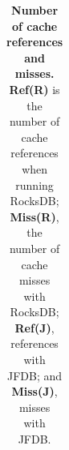 \begin{table}
\begin{tabular}{| l | r | r | r | r | }
    \end{tabular}
    \vspace{5pt}
    \caption{\textbf{Number of cache references and misses.}
        \textbf{Ref(R)} is the number of cache references when running RocksDB; 
        \textbf{Miss(R)}, the number of cache misses with RocksDB; 
        \textbf{Ref(J)}, references with JFDB; and \textbf{Miss(J)}, misses with JFDB.
    }    
    \label{tab_cache_miss}
\end{table}
 



%

